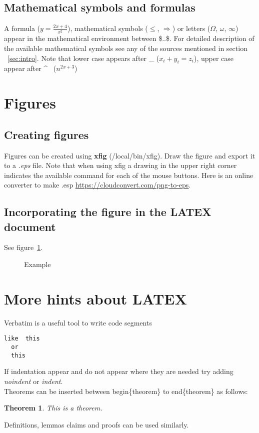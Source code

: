 \documentclass [12pt]{article}
\newtheorem{theorem}{Theorem}[section]
\begin{document}
\subsection{Mathematical symbols and formulas}
A formula ($y=\frac{2x+4}{x^2}$), mathematical symbols ($\leq$, $\Rightarrow$) or letters ($\Omega$, $\omega$, $\infty$) appear in the mathematical environment between \$..\$. For detailed description of the available mathematical symbols see any of the sources mentioned in section ~\ref{sec:intro}. Note that lower case appears after \_ ($x_{i}+y_{i}=z_{i}$), upper case appear after \^~ ($n^{2x+3}$)

\section{Figures}
\subsection{Creating figures}
Figures can be created using {\bf xfig} (/local/bin/xfig). Draw the figure and export it to a {\it .eps} file. Note that when using xfig a drawing in the upper right corner indicates the available command for each of the mouse buttons. Here is an online converter to make .esp \url{https://cloudconvert.com/png-to-eps}. 

\subsection{Incorporating the figure in the LATEX document}
See figure~\ref{fig:ex}.

\begin{figure}
\centerline{}
\caption{Example}
\label{fig:ex}
\end{figure}

\section{More hints about LATEX}
Verbatim is a useful tool to write code segments
\begin{verbatim}
like  this
  or  
  this 
\end{verbatim}
If indentation appear and do not appear where they are needed try adding {\it noindent} or {\it indent}.  \\

\noindent Theorems can be inserted between begin\{theorem\} to end\{theorem\} as follows:
\begin{theorem}
This is a theorem.
\end{theorem}
Definitions, lemmas claims and proofs can be used similarly.
\end{document}

